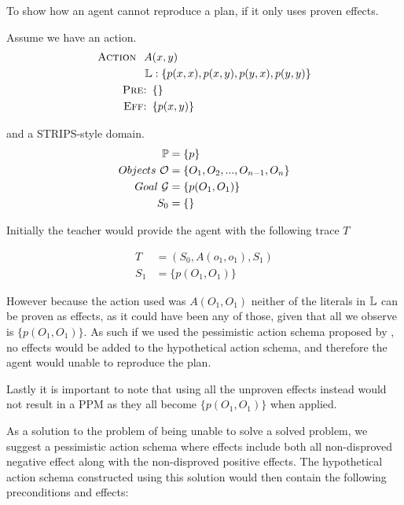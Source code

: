 \documentclass[\master/Master.tex]{subfiles}
\begin{document}
	\begin{example}
		To show how an agent cannot reproduce a plan, if it only uses proven effects.
		
		Assume we have an action.
		\begin{equation*}
			\begin{split}
				\textsc{Action } ~ A &(x, y) \\
					\mathbb{L}&: \{ p(x,x), p(x,y), p(y,x), p(y,y) \} \\
					\textsc{Pre: } & \{\} \\
					\textsc{Eff: } & \{p(x,y)\}			
			\end{split}
		\end{equation*}
		
		and a STRIPS-style domain.
		\begin{equation*}
			\begin{split}
				\mathbb{P} &= \{p\}		\\
				Objects~\mathcal{O} &= \{O_1,O_2,...,O_{n-1},O_n\} \\
				Goal~\mathcal{G} &= \{p(O_1,O_1)\} \\
				S_0 &=\{\}
			\end{split}
		\end{equation*}
		
		Initially the teacher would provide the agent with the following trace $T$
		
		\begin{equation*}
			\begin{split}				
				T &= (S_0,A(o_1,o_1),S_1) \\
				S_1 &= \{p(O_1,O_1)\}				
			\end{split}
		\end{equation*}
		
		However because the action used was $A(O_1,O_1)$ neither of the literals in $\mathbb{L}$ can be proven as effects, as it could have been any of those, given that all we observe is $\{p(O_1,O_1)\}$. 
		As such if we used the pessimistic action schema proposed by \cite{Walsh2008}, no effects would be added to the hypothetical action schema, and therefore the agent would unable to reproduce the plan. 
		
		Lastly it is important to note that using all the unproven effects instead would not result in a PPM as they all become $\{p(O_1,O_1)\}$ when applied.
		
	\end{example}
	
As a solution to the problem of being unable to solve a solved problem, we suggest a pessimistic action schema where effects include both all non-disproved negative effect along with the non-disproved positive effects.
The hypothetical action schema constructed using this solution would then contain the following preconditions and effects:
\end{document}
